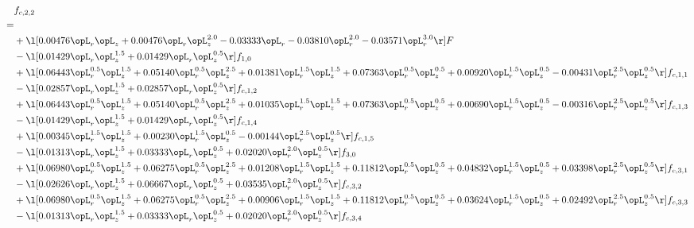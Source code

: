 \begin{alignat}{2} 
\label{eq:f_22_1} 
& f_{c,2,2} \nonumber \\ 
 = \\ 
& + \l[  0.00476 \opL_r \opL_z +  0.00476 \opL_r \opL_z^{2.0}   -0.03333 \opL_r   -0.03810 \opL_r^{2.0}   -0.03571 \opL_r^{3.0}  \r] F \nonumber \\ 
& - \l[  0.01429 \opL_r \opL_z^{1.5} +  0.01429 \opL_r \opL_z^{0.5}  \r] f_{1,0} \nonumber \\ 
& + \l[  0.06443 \opL_r^{0.5} \opL_z^{1.5} +  0.05140 \opL_r^{0.5} \opL_z^{2.5} +  0.01381 \opL_r^{1.5} \opL_z^{1.5} +  0.07363 \opL_r^{0.5} \opL_z^{0.5} +  0.00920 \opL_r^{1.5} \opL_z^{0.5}   -0.00431 \opL_r^{2.5} \opL_z^{0.5}  \r] f_{c,1,1} \nonumber \\ 
& - \l[  0.02857 \opL_r \opL_z^{1.5} +  0.02857 \opL_r \opL_z^{0.5}  \r] f_{c,1,2} \nonumber \\ 
& + \l[  0.06443 \opL_r^{0.5} \opL_z^{1.5} +  0.05140 \opL_r^{0.5} \opL_z^{2.5} +  0.01035 \opL_r^{1.5} \opL_z^{1.5} +  0.07363 \opL_r^{0.5} \opL_z^{0.5} +  0.00690 \opL_r^{1.5} \opL_z^{0.5}   -0.00316 \opL_r^{2.5} \opL_z^{0.5}  \r] f_{c,1,3} \nonumber \\ 
& - \l[  0.01429 \opL_r \opL_z^{1.5} +  0.01429 \opL_r \opL_z^{0.5}  \r] f_{c,1,4} \nonumber \\ 
& + \l[  0.00345 \opL_r^{1.5} \opL_z^{1.5} +  0.00230 \opL_r^{1.5} \opL_z^{0.5}   -0.00144 \opL_r^{2.5} \opL_z^{0.5}  \r] f_{c,1,5} \nonumber \\ 
& - \l[  0.01313 \opL_r \opL_z^{1.5} +  0.03333 \opL_r \opL_z^{0.5} +  0.02020 \opL_r^{2.0} \opL_z^{0.5}  \r] f_{3,0} \nonumber \\ 
& + \l[  0.06980 \opL_r^{0.5} \opL_z^{1.5} +  0.06275 \opL_r^{0.5} \opL_z^{2.5} +  0.01208 \opL_r^{1.5} \opL_z^{1.5} +  0.11812 \opL_r^{0.5} \opL_z^{0.5} +  0.04832 \opL_r^{1.5} \opL_z^{0.5} +  0.03398 \opL_r^{2.5} \opL_z^{0.5}  \r] f_{c,3,1} \nonumber \\ 
& - \l[  0.02626 \opL_r \opL_z^{1.5} +  0.06667 \opL_r \opL_z^{0.5} +  0.03535 \opL_r^{2.0} \opL_z^{0.5}  \r] f_{c,3,2} \nonumber \\ 
& + \l[  0.06980 \opL_r^{0.5} \opL_z^{1.5} +  0.06275 \opL_r^{0.5} \opL_z^{2.5} +  0.00906 \opL_r^{1.5} \opL_z^{1.5} +  0.11812 \opL_r^{0.5} \opL_z^{0.5} +  0.03624 \opL_r^{1.5} \opL_z^{0.5} +  0.02492 \opL_r^{2.5} \opL_z^{0.5}  \r] f_{c,3,3} \nonumber \\ 
& - \l[  0.01313 \opL_r \opL_z^{1.5} +  0.03333 \opL_r \opL_z^{0.5} +  0.02020 \opL_r^{2.0} \opL_z^{0.5}  \r] f_{c,3,4} \nonumber \\ 

\end{alignat}
